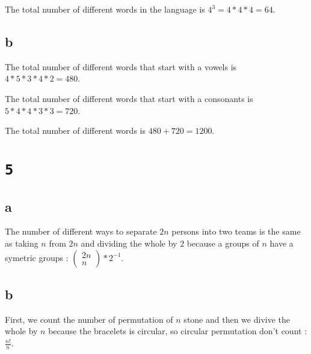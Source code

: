 \documentclass[a4paper,11pt]{report}
\begin{document}
The total number of different words in the language is $4^3 = 4 * 4 * 4 = 64$.

\subsection*{b}

The total number of different words that start with a vowels is $4 * 5 * 3 * 4 *
2 = 480$.

The total number of different words that start with a consonants is $5 * 4 * 4 *
3 * 3 = 720$.

The total number of different words is $480 + 720 = 1200$.

\section*{\texttt{5}}
\subsection*{a}

The number of different ways to separate $2n$ persons into two teams is the same
as taking $n$ from $2n$ and dividing the whole by $2$ because a groups of $n$
have a symetric groups : $\begin{pmatrix}2n \\ n\end{pmatrix} * 2^{-1}$.

\subsection*{b}

First, we count the number of permutation of $n$ stone and then we divive the
whole by $n$ because the bracelets is circular, so circular permutation don't
count : $\frac{n!}{n}$.
\end{document}
